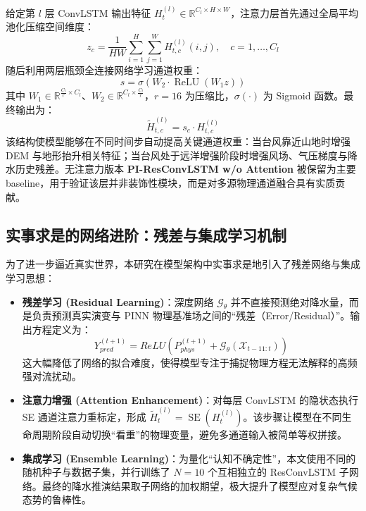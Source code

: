 \documentclass[12pt,a4paper]{ctexart}
\begin{document}
给定第 $l$ 层 ConvLSTM 输出特征 $H_t^{(l)} \in \mathbb{R}^{C_l \times H \times W}$，注意力层首先通过全局平均池化压缩空间维度：
\begin{equation}
    z_c = \frac{1}{H W}\sum_{i=1}^{H}\sum_{j=1}^{W} H_{t,c}^{(l)}(i,j), \quad c=1,\ldots,C_l
\end{equation}
随后利用两层瓶颈全连接网络学习通道权重：
\begin{equation}
    s = \sigma \left( W_2 \cdot \operatorname{ReLU}(W_1 z) \right)
\end{equation}
其中 $W_1 \in \mathbb{R}^{\frac{C_l}{r} \times C_l}$、$W_2 \in \mathbb{R}^{C_l \times \frac{C_l}{r}}$，$r=16$ 为压缩比，$\sigma(\cdot)$ 为 Sigmoid 函数。最终输出为：
\begin{equation}
    \tilde{H}_{t,c}^{(l)} = s_c \cdot H_{t,c}^{(l)}
\end{equation}
该结构使模型能够在不同时间步自动提高关键通道权重：当台风靠近山地时增强 DEM 与地形抬升相关特征；当台风处于远洋增强阶段时增强风场、气压梯度与降水历史残差。无注意力版本 \textbf{PI-ResConvLSTM w/o Attention} 被保留为主要 baseline，用于验证该层并非装饰性模块，而是对多源物理通道融合具有实质贡献。

\subsection{实事求是的网络进阶：残差与集成学习机制}
为了进一步逼近真实世界，本研究在模型架构中实事求是地引入了残差网络与集成学习思想：
\begin{itemize}
    \item \textbf{残差学习 (Residual Learning)}：深度网络 $\mathcal{G}_{\theta}$ 并不直接预测绝对降水量，而是负责预测真实演变与 PINN 物理基准场之间的“残差（Error/Residual）”。输出方程定义为：
    \begin{equation}
        Y_{pred}^{(t+1)} = ReLU\left( P_{phys}^{(t+1)} + \mathcal{G}_{\theta}\left( \mathcal{X}_{t-11:t} \right) \right)
    \end{equation}
    这大幅降低了网络的拟合难度，使得模型专注于捕捉物理方程无法解释的高频强对流扰动。
    \item \textbf{注意力增强 (Attention Enhancement)}：对每层 ConvLSTM 的隐状态执行 SE 通道注意力重标定，形成 $\tilde{H}_{t}^{(l)}=\operatorname{SE}(H_t^{(l)})$。该步骤让模型在不同生命周期阶段自动切换“看重”的物理变量，避免多通道输入被简单等权拼接。
    \item \textbf{集成学习 (Ensemble Learning)}：为量化“认知不确定性”，本文使用不同的随机种子与数据子集，并行训练了 $N=10$ 个互相独立的 ResConvLSTM 子网络。最终的降水推演结果取子网络的加权期望，极大提升了模型应对复杂气候态势的鲁棒性。
\end{itemize}
\end{document}
